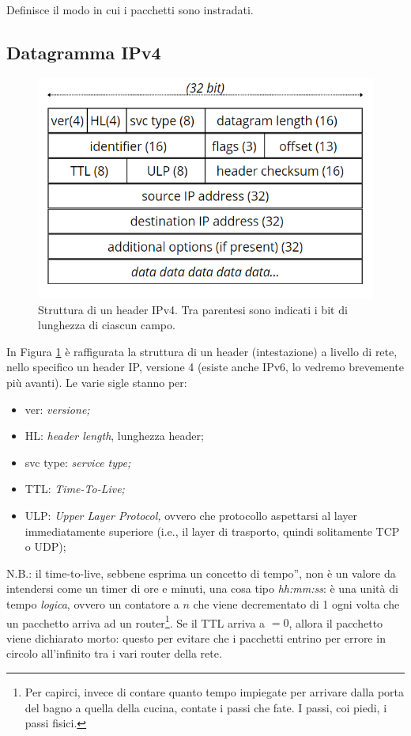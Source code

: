 \noindent Definisce il modo in cui i pacchetti sono instradati.\\
\subsection*{Datagramma IPv4}

\begin{figure} [h]
    \centering
    \includegraphics[width=0.5\linewidth]{Figures/04/headerIPv4.png}
    \caption{Struttura di un header IPv4. Tra parentesi sono indicati i bit di lunghezza di ciascun campo.}
    \label{fig:headipv4}

\end{figure}

\noindent In Figura \ref{fig:headipv4} è raffigurata la struttura di un header (intestazione) a livello di rete, nello specifico un header IP, versione 4 (esiste anche IPv6, lo vedremo brevemente più avanti). Le varie sigle stanno per:
\begin{itemize}
    \item ver: \textit{versione;}
    \item HL: \textit{header length}, lunghezza header;
    \item svc type: \textit{service type;}
    \item TTL: \textit{Time-To-Live;}
    \item ULP: \textit{Upper Layer Protocol,} ovvero che protocollo aspettarsi al layer immediatamente superiore (i.e., il layer di trasporto, quindi solitamente TCP o UDP);
\end{itemize}

\noindent N.B.: il time-to-live, sebbene esprima un concetto di \openapex tempo'', non è un valore da intendersi come un timer di ore e minuti, una cosa tipo \textit{hh:mm:ss}: è una unità di tempo \textit{logica}, ovvero un contatore a $n$ che viene decrementato di 1 ogni volta che un pacchetto arriva ad un router\footnote{Per capirci, invece di contare quanto tempo impiegate per arrivare dalla porta del bagno a quella della cucina, contate i passi che fate. I passi, coi piedi, i passi fisici.}. Se il TTL arriva a $=0$, allora il pacchetto viene dichiarato morto: questo per evitare che i pacchetti entrino per errore in circolo all'infinito tra i vari router della rete.\\


